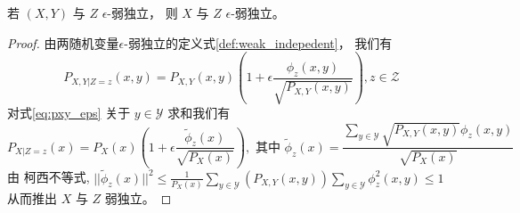 \begin{lemma}\label{lem:xyz}
	若 $(X,Y)$ 与 $Z$ $\epsilon$-弱独立，
  则 $X$ 与 $Z$ $\epsilon$-弱独立。
\end{lemma}
\begin{proof}
	由两随机变量$\epsilon$-弱独立的定义式\ref{def:weak_indepedent}，
  我们有
	\begin{equation}\label{eq:pxy_eps}
	P_{X,Y|Z=z}(x,y) = P_{X,Y}(x,y)\left(1+\epsilon \frac{\phi_z(x,y)}{\sqrt{P_{X,Y}(x,y)}}
  \right), z \in \mathcal{Z}
	\end{equation}
	对式\ref{eq:pxy_eps} 关于 $y\in \mathcal{Y}$ 求和我们有
	\begin{equation}
	P_{X|Z=z}(x) = P_X(x)\left(1+\epsilon\frac{\tilde{\phi}_z(x)}{\sqrt{P_X(x)}} \right),
	\textrm{ 其中 } \tilde{\phi}_z(x) = \frac{\sum_{y\in \mathcal{Y}} \sqrt{P_{X,Y}(x,y) }\phi_z(x,y)}{\sqrt{P_X(x)}}
	\end{equation}
	由 柯西不等式, $||\tilde{\phi}_z(x)||^2 \leq \frac{1}{P_X(x)}
	\sum_{y\in \mathcal{Y}}(P_{X,Y}(x,y))
	\sum_{y\in \mathcal{Y}} \phi_z^2(x,y) \leq 1
	$
	从而推出 $X$  与 $Z$ 弱独立。
\end{proof}
